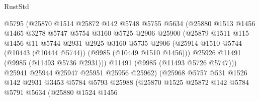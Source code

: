 \begin{lexlean}{RustStd}
\begin{coremodule}
                            @5795
                            (@25870
                              @1514
                              @25872
                              @142
                              @5748
                              @5755
                              @5634
                              (@25880
                                @1513
                                @1456
                                @1465
                                @3278
                                @5747
                                @5754
                                @3160
                                @5725
                                @2906
                                @25900
                                (@25879
                                  @1511
                                  @115
                                  @1456
                                  @11
                                  @5744
                                  @2931
                                  @2925
                                  @3160
                                  @5735
                                  @2906
                                  (@25914
                                    @1510
                                    @5744
                                    (@10443 (@10444 @5744))
                                    (@9985 (@10449 @1510 @1456)))
                                  @25926
                                  @11491
                                  (@9985 (@11493 @5736 @2931)))
                                @11491
                                (@9985 (@11493 @5726 @5747)))
                              @25941
                              @25944
                              @25947
                              @25951
                              @25956
                              @25962)
                            (@25968
                              @5757
                              @531
                              @1526
                              @142
                              @2931
                              @3453
                              @5784
                              @5793
                              @25988
                              (@25870
                                @1525
                                @25872
                                @142
                                @5784
                                @5791
                                @5634
                                (@25880
                                  @1524
                                  @1456

\end{coremodule}
\end{lexlean}
